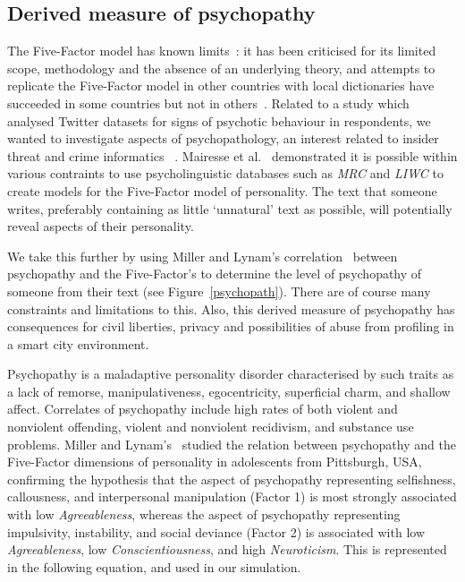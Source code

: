 \documentclass[conference]{IEEEtran}
\begin{document}
\subsection{Derived measure of psychopathy}

The Five-Factor model has known
limits~\cite{eysenck:1992,paunonen+jackson:2000,block:2010}: it has
been criticised for its limited scope, methodology and the absence of
an underlying theory, and attempts to replicate the Five-Factor model
in other countries with local dictionaries have succeeded in some
countries but not in
others~\cite{szirmak+deraad:1994,defruyt-et-al:2004}. Related to a
study which analysed Twitter datasets for signs of psychotic behaviour
in respondents, we wanted to investigate aspects of psychopathology,
an interest related to insider threat and crime informatics
~\cite{oatley+crick:2014,oatley+crick_asonam2014,oatley+crick_fosintsi2014,oatley+crick:2015}.
Mairesse et al.~\cite{mairesse-et-al:2007} demonstrated it is possible
within various contraints to use psycholinguistic databases such as
{\emph{MRC}} and {\emph{LIWC}} to create models for the Five-Factor
model of personality. The text that someone writes, preferably
containing as little `unnatural' text as possible, will potentially
reveal aspects of their personality.

We take this further by using Miller and Lynam's
correlation~\cite{miller+lynam:2003,lynam-et-al:2005} between
psychopathy and the Five-Factor's to determine the level of
psychopathy of someone from their text (see
Figure~\ref{psychopath}). There are of course many constraints and
limitations to this. Also, this derived measure of psychopathy has
consequences for civil liberties, privacy and possibilities of abuse
from profiling in a smart city environment.

Psychopathy is a maladaptive personality disorder characterised by
such traits as a lack of remorse, manipulativeness, egocentricity,
superficial charm, and shallow affect. Correlates of psychopathy
include high rates of both violent and nonviolent offending, violent
and nonviolent recidivism, and substance use problems. Miller and
Lynam's~\cite{miller+lynam:2003,lynam-et-al:2005} studied the relation
between psychopathy and the Five-Factor dimensions of personality in
adolescents from Pittsburgh, USA, confirming the hypothesis that the
aspect of psychopathy representing selfishness, callousness, and
interpersonal manipulation (Factor 1) is most strongly associated with
low {\emph{Agreeableness}}, whereas the aspect of psychopathy
representing impulsivity, instability, and social deviance (Factor 2)
is associated with low {\emph{Agreeableness}}, low
{\emph{Conscientiousness}}, and high {\emph{Neuroticism}}. This is
represented in the following equation, and used in our simulation.
\end{document}
